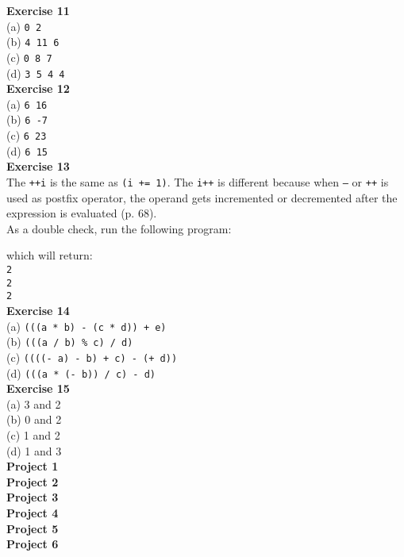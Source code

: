 \documentclass[a4paper, 10pt]{article}
\begin{document}
\textbf{Exercise 11} \\
(a) \texttt{0 2} \\
(b) \texttt{4 11 6} \\
(c) \texttt{0 8 7} \\
(d) \texttt{3 5 4 4} \\

\textbf{Exercise 12} \\
(a) \texttt{6 16} \\
(b) \texttt{6 -7} \\
(c) \texttt{6 23} \\
(d) \texttt{6 15} \\ 

\textbf{Exercise 13} \\
The \texttt{++i} is the same as \texttt{(i += 1)}. The \texttt{i++} is different because when \texttt{--} or \texttt{++} is used as postfix operator, the operand gets incremented or decremented after the expression is evaluated (p. 68). \\

As a double check, run the following program:

which will return: \\
\texttt{2 \\ 2 \\ 2} \\

\textbf{Exercise 14} \\
(a) \texttt{(((a * b) - (c * d)) + e)} \\
(b) \texttt{(((a / b) \% c) / d)} \\
(c) \texttt{((((- a) - b) + c) - (+ d))} \\
(d) \texttt{(((a * (- b)) / c) - d)} \\

\textbf{Exercise 15} \\
(a) 3 and 2 \\
(b) 0 and 2 \\
(c) 1 and 2 \\
(d) 1 and 3 \\

\textbf{Project 1} \\


\textbf{Project 2} \\


\textbf{Project 3} \\


\textbf{Project 4} \\


\textbf{Project 5} \\


\textbf{Project 6} \\

\end{document}
